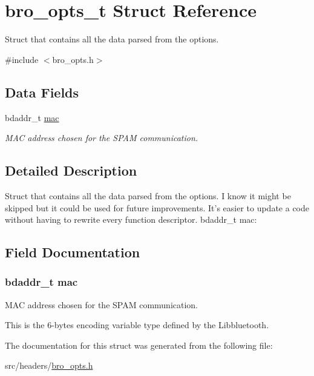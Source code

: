 \hypertarget{structbro__opts__t}{
\section{bro\_\-opts\_\-t Struct Reference}
\label{structbro__opts__t}
}


Struct that contains all the data parsed from the options.  




{\ttfamily \#include $<$bro\_\-opts.h$>$}

\subsection*{Data Fields}
\begin{DoxyCompactItemize}
\item 
bdaddr\_\-t \hyperlink{structbro__opts__t_a948e84481473311b7e41236653773e60}{mac}
\begin{DoxyCompactList}\small\item\em MAC address chosen for the SPAM communication. \item\end{DoxyCompactList}\end{DoxyCompactItemize}


\subsection{Detailed Description}
Struct that contains all the data parsed from the options. I know it might be skipped but it could be used for future improvements. It's easier to update a code without having to rewrite every function descriptor. bdaddr\_\-t mac: 

\subsection{Field Documentation}
\hypertarget{structbro__opts__t_a948e84481473311b7e41236653773e60}{
\subsubsection[{mac}]{\setlength{\rightskip}{0pt plus 5cm}bdaddr\_\-t {\bf mac}}}
\label{structbro__opts__t_a948e84481473311b7e41236653773e60}


MAC address chosen for the SPAM communication. 

This is the 6-\/bytes encoding variable type defined by the Libbluetooth. 

The documentation for this struct was generated from the following file:\begin{DoxyCompactItemize}
\item 
src/headers/\hyperlink{bro__opts_8h}{bro\_\-opts.h}\end{DoxyCompactItemize}
